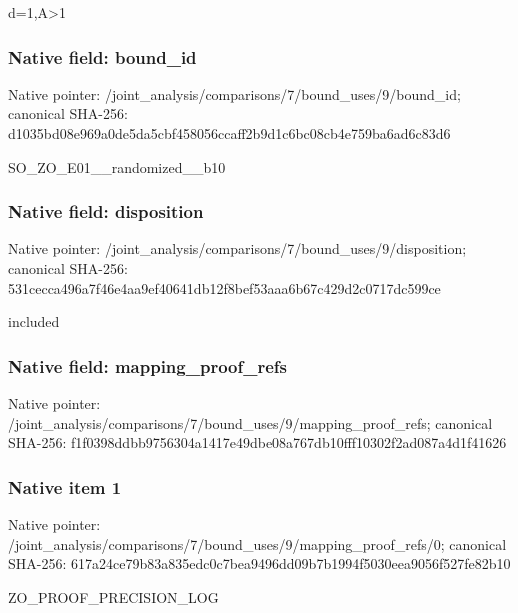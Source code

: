\documentclass[10pt,a4paper]{article}
\begin{document}
\begingroup\raggedright\sloppy d=\allowbreak{}1,\allowbreak{}A>1\par\endgroup

\subsubsection{Native field: bound\_\allowbreak{}id}
Native pointer: /joint\_\allowbreak{}analysis/comparisons/7/bound\_\allowbreak{}uses/9/bound\_\allowbreak{}id; canonical SHA-256: d1035bd08e969a0de5da5cbf458056ccaff2b9d1c6bc08cb4e759ba6ad6c83d6

\begingroup\raggedright\sloppy SO\_\allowbreak{}ZO\_\allowbreak{}E01\_\allowbreak{}\_\allowbreak{}randomized\_\allowbreak{}\_\allowbreak{}b10\par\endgroup

\subsubsection{Native field: disposition}
Native pointer: /joint\_\allowbreak{}analysis/comparisons/7/bound\_\allowbreak{}uses/9/disposition; canonical SHA-256: 531cecca496a7f46e4aa9ef40641db12f8bef53aaa6b67c429d2c0717dc599ce

\begingroup\raggedright\sloppy included\par\endgroup

\subsubsection{Native field: mapping\_\allowbreak{}proof\_\allowbreak{}refs}
Native pointer: /joint\_\allowbreak{}analysis/comparisons/7/bound\_\allowbreak{}uses/9/mapping\_\allowbreak{}proof\_\allowbreak{}refs; canonical SHA-256: f1f0398ddbb9756304a1417e49dbe08a767db10fff10302f2ad087a4d1f41626

\subsubsection{Native item 1}
Native pointer: /joint\_\allowbreak{}analysis/comparisons/7/bound\_\allowbreak{}uses/9/mapping\_\allowbreak{}proof\_\allowbreak{}refs/0; canonical SHA-256: 617a24ce79b83a835edc0c7bea9496dd09b7b1994f5030eea9056f527fe82b10

\begingroup\raggedright\sloppy ZO\_\allowbreak{}PROOF\_\allowbreak{}PRECISION\_\allowbreak{}LOG\par\endgroup
\end{document}

